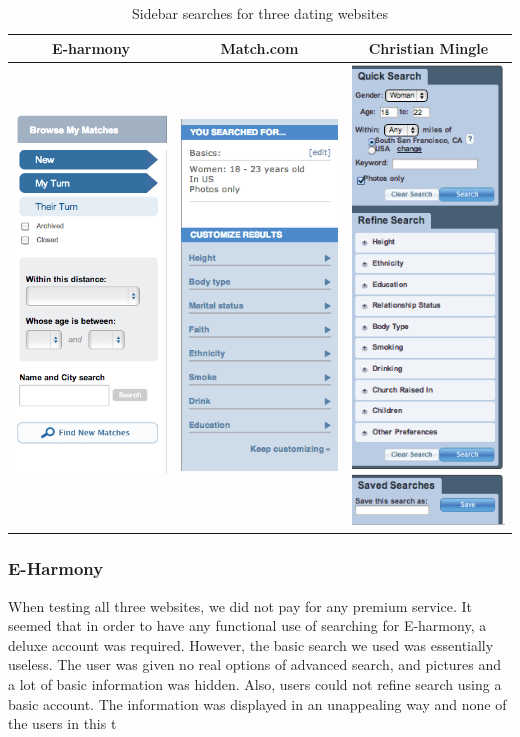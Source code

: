 \documentclass{article}
\begin{document}
\begin{table}
\caption{Sidebar searches for three dating websites}
\centering
\begin{tabular}{|c|c|c|}\hline
E-harmony & Match.com & Christian Mingle \\\hline\hline\hline
\includegraphics[width = 2in]{Eharm2.png} & \includegraphics[width = 2in]{Match2.png} & \includegraphics[width = 2in]{CM2} \\\hline
\end{tabular}
\end{table}
\subsubsection{E-Harmony}
When testing all three websites, we did not pay for any premium service. It seemed that in order to have any functional use of searching for E-harmony, a deluxe account was required. However, the basic search we used was essentially useless. The user was given no real options of advanced search, and pictures and a lot of basic information was hidden. Also, users could not refine search using a basic account. The information was displayed in an unappealing way and none of the users in this t
\end{document}
